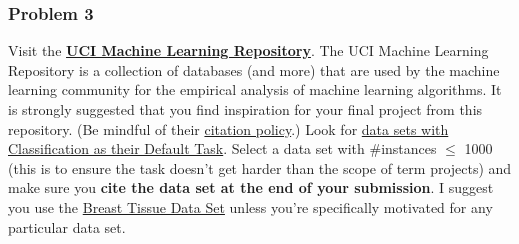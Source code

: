 \documentclass[12pt,a4paper]{article}
\begin{document}
\subsubsection*{Problem 3}
Visit the \href{https://archive.ics.uci.edu/ml/index.php}{\textbf{UCI Machine Learning Repository}}. The UCI Machine Learning Repository is a collection of databases (and more) that are used by the machine learning community for the empirical analysis of machine learning algorithms. It is strongly suggested that you find inspiration for your final project from this repository. (Be mindful of their \href{https://archive.ics.uci.edu/ml/citation_policy.html}{citation policy}.) Look for \href{https://archive.ics.uci.edu/ml/datasets.php?format=&task=cla&att=&area=&numAtt=&numIns=&type=&sort=instUp&view=table}{data sets with Classification as their Default Task}. Select a data set with \#instances $\leq$ 1000 (this is to ensure the task doesn't get harder than the scope of term projects) and make sure you \textbf{cite the data set at the end of your submission}. I suggest you use the \href{https://archive.ics.uci.edu/ml/datasets/Breast+Tissue}{Breast Tissue Data Set} unless you're specifically motivated for any particular data set. 
\end{document}
